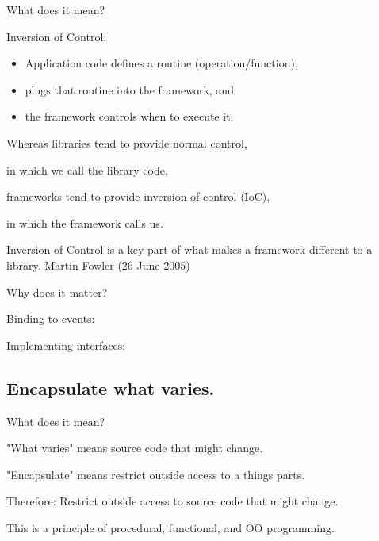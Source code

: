 \documentclass{beamer}
\begin{document}
\begin{frame}{What does it mean?}
    \par Inversion of Control: 
    \begin{itemize}
        \item Application code defines a routine (operation/function),
        \item plugs that routine into the framework, and 
        \item the framework controls when to execute it.
    \end{itemize}
    \par Whereas libraries tend to provide normal control, 
    \par in which we call the library code,
    \par frameworks tend to provide inversion of control (IoC),
    \par in which the framework calls us.
\end{frame}

\begin{frame}
Inversion of Control is a key part of what makes a framework different to a library.
Martin Fowler (26 June 2005)
\end{frame}

\begin{frame}{Why does it matter?}
\end{frame}

\begin{frame}{Binding to events:}
    
\end{frame}

\begin{frame}{Implementing interfaces:}
    
\end{frame}

\subsection{Encapsulate what varies.}

\begin{frame}{What does it mean?}
    \par "What varies" means source code that might change.
    \par "Encapsulate" means restrict outside access to a things parts.
    \par Therefore: Restrict outside access to source code that might change.
    \par This is a principle of procedural, functional, and OO programming.
\end{frame}
\end{document}
